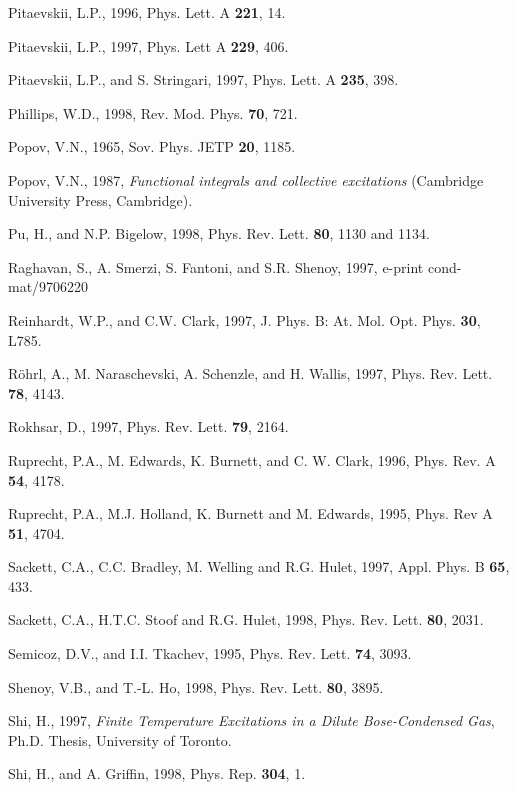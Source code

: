 \begin{references}
 Pitaevskii, L.P., 1996, Phys. Lett. A {\bf 221},
14.

 Pitaevskii, L.P., 1997, Phys. Lett A {\bf 229},
406.

   Pitaevskii, L.P., and S. Stringari, 1997, Phys.
Lett. A {\bf 235}, 398.

   Phillips, W.D., 1998, Rev. Mod. Phys. {\bf 70}, 721. 

    Popov, V.N., 1965, Sov. Phys. JETP {\bf 20}, 1185.

    Popov, V.N., 1987, {\it Functional integrals and
collective excitations} (Cambridge University Press, Cambridge).

  Pu, H., and N.P. Bigelow, 1998, Phys. Rev. Lett. {\bf 80}, 
1130 and 1134. 

  Raghavan, S., A. Smerzi, S. Fantoni, and S.R. Shenoy,
1997, e-print cond-mat/9706220

  Reinhardt, W.P., and C.W. Clark, 1997, J. Phys. B:
At. Mol. Opt. Phys. {\bf 30}, L785.  

    R\"ohrl, A., M. Naraschevski, A. Schenzle, and H.
Wallis, 1997, Phys. Rev. Lett. {\bf 78}, 4143.

  Rokhsar, D., 1997, Phys. Rev. Lett. {\bf 79}, 2164.

 Ruprecht, P.A., M. Edwards, K. Burnett, and C. W.
Clark, 1996, Phys. Rev. A {\bf 54}, 4178. 

 Ruprecht, P.A., M.J. Holland, K. Burnett and M.
Edwards, 1995, Phys. Rev A {\bf 51}, 4704.

  Sackett, C.A., C.C. Bradley, M. Welling and 
R.G. Hulet, 1997, Appl. Phys. B {\bf 65}, 433.

  Sackett, C.A., H.T.C. Stoof and R.G. Hulet, 1998,
Phys. Rev. Lett. {\bf 80}, 2031.

    Semicoz, D.V., and I.I. Tkachev, 1995, Phys. Rev.
Lett. {\bf 74}, 3093.

   Shenoy, V.B., and T.-L. Ho, 1998, Phys. Rev. Lett.
{\bf 80}, 3895. 

      Shi, H., 1997, {\it Finite Temperature Excitations
in a Dilute Bose-Condensed Gas}, Ph.D. Thesis, University of Toronto.

      Shi, H., and A. Griffin, 1998, Phys. Rep. 
{\bf 304}, 1.


\end{references}
